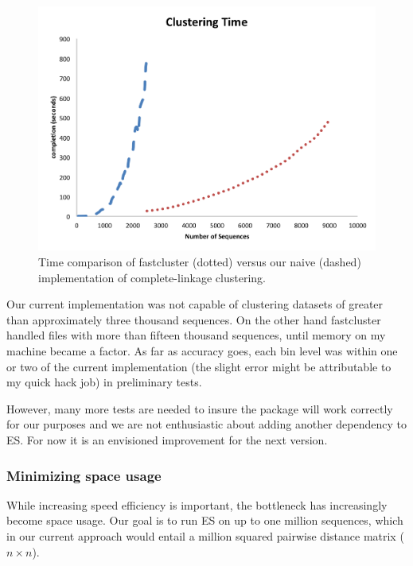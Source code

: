 \begin{figure}[h!]
\centering
\includegraphics[scale=.8]{images/FastVsNaive-CH3}
\caption[Time comparison of fastcluster versus our naive implementation of complete-linkage clustering.]{Time comparison of fastcluster (dotted) versus our naive (dashed) implementation of complete-linkage clustering.}
\label{fig:FastVsNaive}
\end{figure}

Our current implementation was not capable of clustering datasets of greater than approximately three thousand sequences.
On the other hand fastcluster handled files with more than fifteen thousand sequences, until memory on my machine became a factor.
As far as accuracy goes, each bin level was within one or two of the current implementation (the slight error might be attributable to my quick hack job) in preliminary tests.

However, many more tests are needed to insure the package will work correctly for our purposes and we are not enthusiastic about adding another dependency to ES.
For now it is an envisioned improvement for the next version.

\subsubsection*{Minimizing space usage}
While increasing speed efficiency is important, the bottleneck has increasingly become space usage.
Our goal is to run ES on up to one million sequences, which in our current approach would entail a million squared pairwise distance matrix ($n \times n$).

